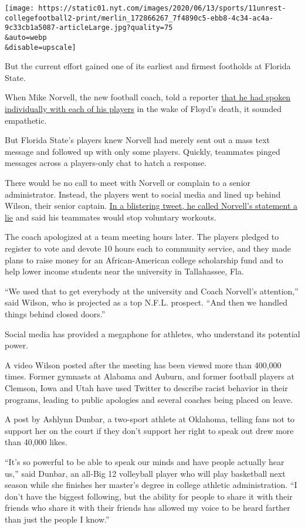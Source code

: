 \texttt{[image: https://static01.nyt.com/images/2020/06/13/sports/11unrest-collegefootball2-print/merlin\_172866267\_7f4890c5-ebb8-4c34-ac4a-9c33cb1a5087-articleLarge.jpg?quality=75\\\&auto=webp\\\&disable=upscale]}

But the current effort gained one of its earliest and firmest footholds
at Florida State.

When Mike Norvell, the new football coach, told a reporter
\href{https://twitter.com/tashanreed/status/1267967609007267841}{that he
had spoken individually with each of his players} in the wake of Floyd's
death, it sounded empathetic.

But Florida State's players knew Norvell had merely sent out a mass text
message and followed up with only some players. Quickly, teammates
pinged messages across a players-only chat to hatch a response.

There would be no call to meet with Norvell or complain to a senior
administrator. Instead, the players went to social media and lined up
behind Wilson, their senior captain.
\href{https://twitter.com/marvinwilson21/status/1268395525495193601}{In
a blistering tweet, he called Norvell's statement a lie} and said his
teammates would stop voluntary workouts.

The coach apologized at a team meeting hours later. The players pledged
to register to vote and devote 10 hours each to community service, and
they made plans to raise money for an African-American college
scholarship fund and to help lower income students near the university
in Tallahassee, Fla.

``We used that to get everybody at the university and Coach Norvell's
attention,'' said Wilson, who is projected as a top N.F.L. prospect.
``And then we handled things behind closed doors.''

Social media has provided a megaphone for athletes, who understand its
potential power.

A video Wilson posted after the meeting has been viewed more than
400,000 times. Former gymnasts at Alabama and Auburn, and former
football players at Clemson, Iowa and Utah have used Twitter to describe
racist behavior in their programs, leading to public apologies and
several coaches being placed on leave.

A post by Ashlynn Dunbar, a two-sport athlete at Oklahoma, telling fans
not to support her on the court if they don't support her right to speak
out drew more than 40,000 likes.

``It's so powerful to be able to speak our minds and have people
actually hear us,'' said Dunbar, an all-Big 12 volleyball player who
will play basketball next season while she finishes her master's degree
in college athletic administration. ``I don't have the biggest
following, but the ability for people to share it with their friends who
share it with their friends has allowed my voice to be heard farther
than just the people I know.''

